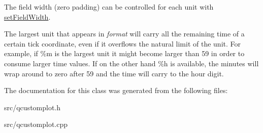 The field width (zero padding) can be controlled for each unit with \hyperlink{classQCPAxisTickerTime_adc13e54fc969be98a5c0e3fa0dbaa293}{set\+Field\+Width}.

The largest unit that appears in {\itshape format} will carry all the remaining time of a certain tick coordinate, even if it overflows the natural limit of the unit. For example, if \%m is the largest unit it might become larger than 59 in order to consume larger time values. If on the other hand \%h is available, the minutes will wrap around to zero after 59 and the time will carry to the hour digit. 

The documentation for this class was generated from the following files\+:\begin{DoxyCompactItemize}
\item 
src/qcustomplot.\+h\item 
src/qcustomplot.\+cpp\end{DoxyCompactItemize}
